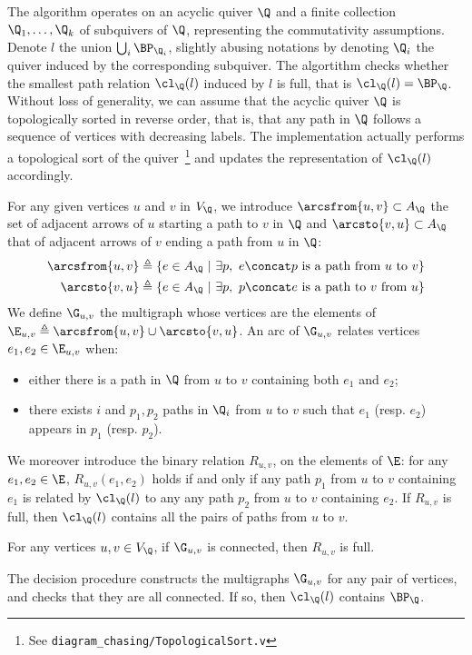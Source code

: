 The algorithm operates on an acyclic quiver $\Q$ and a finite collection $\Q_1, \dots, \Q_k$ of subquivers of $\Q$, representing the commutativity assumptions. Denote $l$ the union $\bigcup_{i}\BP_{\Q_i}$, slightly abusing notations by denoting $\Q_i$ the quiver induced by the corresponding subquiver. The algortithm checks whether the smallest path relation $\cl_\Q(l)$ induced by $l$ is full, that is $\cl_\Q(l) = \BP_\Q$. Without loss of generality, we can assume that the acyclic quiver $\Q$ is topologically sorted in reverse order, that is, that any path in $\Q$ follows a sequence of vertices with decreasing labels. The implementation actually performs a topological sort of the quiver~\footnote{See \texttt{diagram\_chasing/TopologicalSort.v}} and updates the representation of $\cl_\Q(l)$ accordingly.

For any given vertices $u$ and $v$ in $V_\Q$, we introduce $\arcsfrom{u,v} \subset A_\Q$ the set of adjacent arrows of $u$ starting a path to $v$ in $\Q$ and $\arcsto{v,u} \subset A_\Q$ that of adjacent arrows of $v$ ending a path from $u$ in $\Q$:
\begin{align*}
\arcsfrom{u,v} & \triangleq \{ e \in A_\Q\ |\ \exists p,\ e\concat p \textrm{ is a path from } u \textrm{ to } v \} \\
\arcsto{v,u} & \triangleq \{ e \in A_\Q\ |\ \exists p,\ p\concat e \textrm{ is a path to } v \textrm{ from } u \}
\end{align*}
We define $\G_{u,v}$ the multigraph whose vertices are the elements of $\E_{u,v} \triangleq \arcsfrom{u,v} \cup \arcsto{v,u}$. An arc of $\G_{u,v}$ relates vertices $e_1, e_2 \in \E_{u,v}$ when:
\begin{itemize}
  \item either there is a path in $\Q$ from $u$ to $v$ containing both $e_1$ and $e_2$;
  \item there exists $i$ and $p_1, p_2$ paths in $\Q_i$ from $u$ to $v$ such that $e_1$ (resp. $e_2$) appears in $p_1$ (resp. $p_2$).
\end{itemize}
We moreover introduce the binary relation $R_{u,v}$, on the elements of $\E$: for any $e_1, e_2 \in \E$, $R_{u,v}(e_1, e_2)$ holds if and only if any path $p_1$ from $u$ to $v$ containing $e_1$ is related by $\cl_\Q(l)$ to any  any path $p_2$ from $u$ to $v$ containing $e_2$. If $R_{u,v}$ is full, then $\cl_\Q(l)$ contains all the pairs of paths from $u$ to $v$.
\begin{lemma}\label{lem:commerge}
  For any vertices $u,v \in V_\Q$, if\/ $\G_{u,v}$ is connected, then $R_{u,v}$ is full.
\end{lemma}
The decision procedure constructs the multigraphs $\G_{u,v}$ for any pair of vertices, and checks that they are all connected. If so, then $\cl_\Q(l)$ contains $\BP_\Q$.

